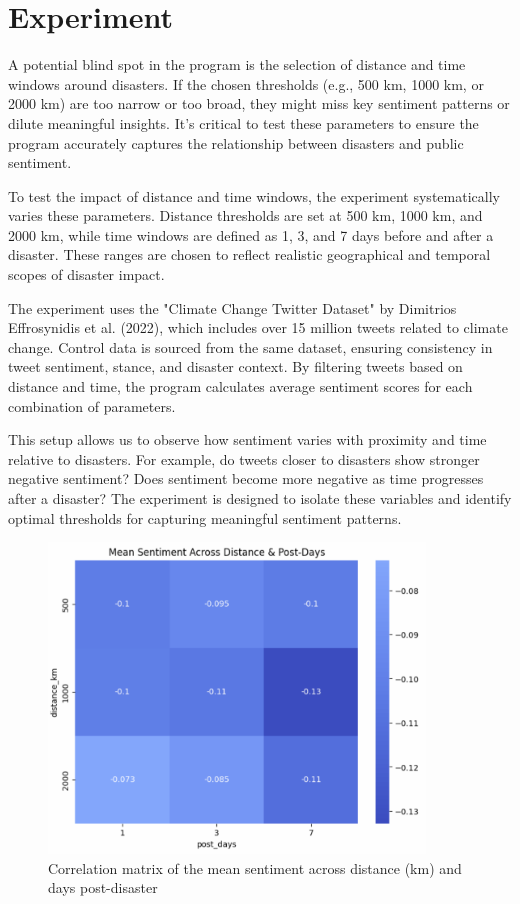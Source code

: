 \documentclass[pdflatex,sn-mathphys-num]{sn-jnl}%
\theoremstyle{thmstyleone}%
\theoremstyle{thmstyletwo}%
\theoremstyle{thmstylethree}%
\begin{document}
\section{Experiment}\label{sec4}
A potential blind spot in the program is the selection of distance and time windows around disasters. If the chosen thresholds (e.g., 500 km, 1000 km, or 2000 km) are too narrow or too broad, they might miss key sentiment patterns or dilute meaningful insights. It’s critical to test these parameters to ensure the program accurately captures the relationship between disasters and public sentiment.

To test the impact of distance and time windows, the experiment systematically varies these parameters. Distance thresholds are set at 500 km, 1000 km, and 2000 km, while time windows are defined as 1, 3, and 7 days before and after a disaster. These ranges are chosen to reflect realistic geographical and temporal scopes of disaster impact.

The experiment uses the "Climate Change Twitter Dataset" by Dimitrios Effrosynidis et al. (2022), which includes over 15 million tweets related to climate change. Control data is sourced from the same dataset, ensuring consistency in tweet sentiment, stance, and disaster context. By filtering tweets based on distance and time, the program calculates average sentiment scores for each combination of parameters.

This setup allows us to observe how sentiment varies with proximity and time relative to disasters. For example, do tweets closer to disasters show stronger negative sentiment? Does sentiment become more negative as time progresses after a disaster? The experiment is designed to isolate these variables and identify optimal thresholds for capturing meaningful sentiment patterns.


\begin{figure}[H]
\centering
\includegraphics[width=10cm]{images/climatechangepulse7.PNG}
\caption{Correlation matrix of the mean sentiment across distance (km) and days post-disaster}
\end{figure}
\end{document}
